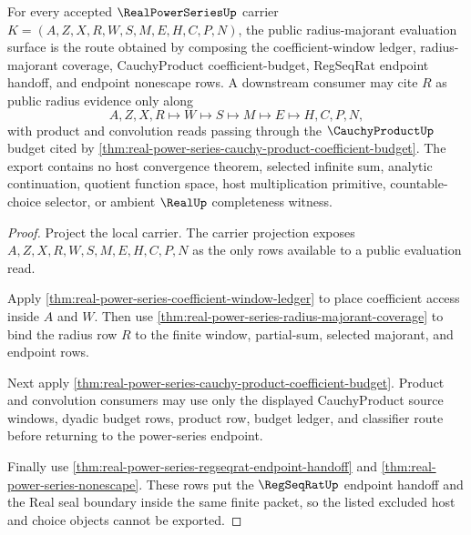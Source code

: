 \begin{theorem}
\label{thm:real-power-series-radius-majorant-public-export}
For every accepted $\RealPowerSeriesUp$ carrier $K=(A,Z,X,R,W,S,M,E,H,C,P,N)$, the public radius-majorant evaluation surface is the route obtained by composing the coefficient-window ledger, radius-majorant coverage, CauchyProduct coefficient-budget, RegSeqRat endpoint handoff, and endpoint nonescape rows. A downstream consumer may cite $R$ as public radius evidence only along
$$
A,Z,X,R \longmapsto W \longmapsto S \longmapsto M \longmapsto E \longmapsto H,C,P,N,
$$
with product and convolution reads passing through the $\CauchyProductUp$ budget cited by \autoref{thm:real-power-series-cauchy-product-coefficient-budget}. The export contains no host convergence theorem, selected infinite sum, analytic continuation, quotient function space, host multiplication primitive, countable-choice selector, or ambient $\RealUp$ completeness witness.
\end{theorem}
\begin{proof}
Project the local carrier. The carrier projection exposes $A,Z,X,R,W,S,M,E,H,C,P,N$ as the only rows available to a public evaluation read.

Apply \autoref{thm:real-power-series-coefficient-window-ledger} to place coefficient access inside $A$ and $W$. Then use \autoref{thm:real-power-series-radius-majorant-coverage} to bind the radius row $R$ to the finite window, partial-sum, selected majorant, and endpoint rows.

Next apply \autoref{thm:real-power-series-cauchy-product-coefficient-budget}. Product and convolution consumers may use only the displayed CauchyProduct source windows, dyadic budget rows, product row, budget ledger, and classifier route before returning to the power-series endpoint.

Finally use \autoref{thm:real-power-series-regseqrat-endpoint-handoff} and \autoref{thm:real-power-series-nonescape}. These rows put the $\RegSeqRatUp$ endpoint handoff and the Real seal boundary inside the same finite packet, so the listed excluded host and choice objects cannot be exported.
\end{proof}

